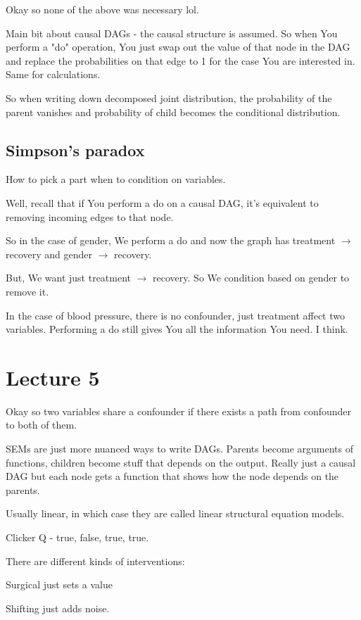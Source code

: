 \documentclass{article}
\begin{document}
	Okay so none of the above was necessary lol.
	
	Main bit about causal DAGs - the causal structure is assumed. So when You perform a "do" operation, You just swap out the value of that node in the DAG and replace the probabilities on that edge to 1 for the case You are interested in. Same for calculations.
	
	So when writing down decomposed joint distribution, the probability of the parent vanishes and probability of child becomes the conditional distribution.
	
	\subsection{Simpson's paradox}
	
		How to pick a part when to condition on variables.
		
		Well, recall that if You perform a do on a causal DAG, it's equivalent to removing incoming edges to that node. 
		
		So in the case of gender, We perform a do and now the graph has treatment $\to$ recovery and gender $\to$ recovery.
		
		But, We want just treatment $\to$ recovery. So We condition based on gender to remove it. 
		
		In the case of blood pressure, there is no confounder, just treatment affect two variables. Performing a do still gives You all the information You need. I think.
		
\section{Lecture 5}

	Okay so two variables share a confounder if there exists a path from confounder to both of them.
	
	SEMs are just more nuanced ways to write DAGs. Parents become arguments of functions, children become stuff that depends on the output. Really just a causal DAG but each node gets a function that shows how the node depends on the parents.
	
	Usually linear, in which case they are called linear structural equation models.
	
	Clicker Q - true, false, true, true.
	
	There are different kinds of interventions:
	
	Surgical just sets a value
	
	Shifting just adds noise.
	
\end{document}
